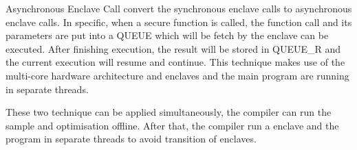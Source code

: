 Asynchronous Enclave Call convert the synchronous enclave calls to asynchronous
enclave calls. In specific, when a secure function is called,
the function call and its parameters are put into a QUEUE which will be fetch by
the enclave can be executed. After finishing execution, the result will be 
stored
in QUEUE\_R and the current execution will resume and continue. 
This technique makes use of the multi-core
hardware architecture and enclaves and the main program are running in separate
threads.

These two technique can be applied simultaneously, the compiler can run the
sample and optimisation offline. After that, the compiler run a enclave and the 
program
in separate threads to avoid transition of enclaves.

% 
% 
% 
% 

